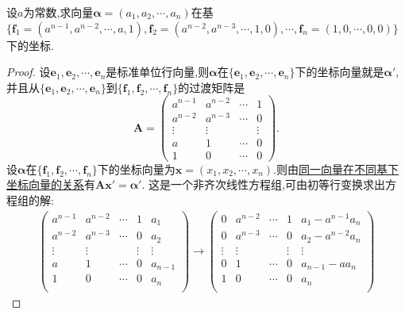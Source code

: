 \documentclass[../../main.tex]{subfiles}%
\begin{document}
\begin{example}
设\(a\)为常数,求向量\(\boldsymbol{\alpha}=(a_1,a_2,\cdots,a_n)\)在基\(\{\boldsymbol{f}_1=(a^{n - 1},a^{n - 2},\cdots,a,1),\boldsymbol{f}_2=(a^{n - 2},a^{n - 3},\cdots,1,0),\cdots,\boldsymbol{f}_n=(1,0,\cdots,0,0)\}\)下的坐标.
\end{example}
\begin{proof}

设\(\boldsymbol{e}_1,\boldsymbol{e}_2,\cdots,\boldsymbol{e}_n\)是标准单位行向量,则\(\boldsymbol{\alpha}\)在\(\{\boldsymbol{e}_1,\boldsymbol{e}_2,\cdots,\boldsymbol{e}_n\}\)下的坐标向量就是$\boldsymbol{\alpha}'$,并且从\(\{\boldsymbol{e}_1,\boldsymbol{e}_2,\cdots,\boldsymbol{e}_n\}\)到\(\{\boldsymbol{f}_1,\boldsymbol{f}_2,\cdots,\boldsymbol{f}_n\}\)的过渡矩阵是
\[
\boldsymbol{A}=\begin{pmatrix}
a^{n - 1}&a^{n - 2}&\cdots&1\\
a^{n - 2}&a^{n - 3}&\cdots&0\\
\vdots&\vdots&&\vdots\\
a&1&\cdots&0\\
1&0&\cdots&0
\end{pmatrix}.
\]
设\(\boldsymbol{\alpha}\)在\(\{\boldsymbol{f}_1,\boldsymbol{f}_2,\cdots,\boldsymbol{f}_n\}\)下的坐标向量为\(\boldsymbol{x}=(x_1,x_2,\cdots,x_n)\).则由\hyperref[theorem:同一向量在不同基下坐标向量的关系]{同一向量在不同基下坐标向量的关系}有\(\boldsymbol{A}\boldsymbol{x}'=\boldsymbol{\alpha}'\). 这是一个非齐次线性方程组,可由初等行变换求出方程组的解:
\begin{gather*}
\left( \begin{matrix}
a^{n-1}&		a^{n-2}&		\cdots&		1&		a_1\\
a^{n-2}&		a^{n-3}&		\cdots&		0&		a_2\\
\vdots&		\vdots&		&		\vdots&		\vdots\\
a&		1&		\cdots&		0&		a_{n-1}\\
1&		0&		\cdots&		0&		a_n\\
\end{matrix} \right) \rightarrow \left( \begin{matrix}
0&		a^{n-2}&		\cdots&		1&		a_1-a^{n-1}a_n\\
0&		a^{n-3}&		\cdots&		0&		a_2-a^{n-2}a_n\\
\vdots&		\vdots&		&		\vdots&		\vdots\\
0&		1&		\cdots&		0&		a_{n-1}-aa_n\\
1&		0&		\cdots&		0&		a_n\\
\end{matrix} \right) 

\end{gather*}
\end{proof}
\end{document}
